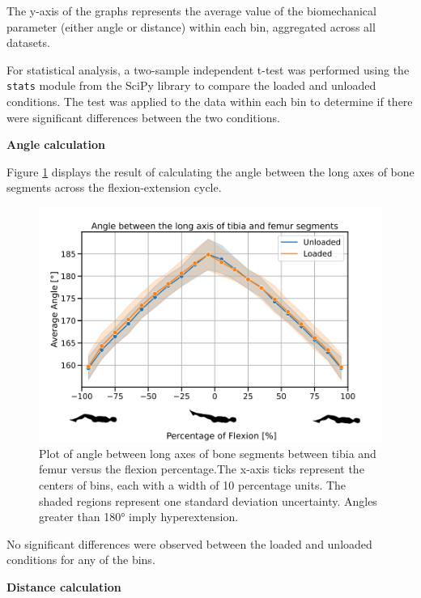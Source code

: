 \documentclass{micro-econ-thesis}
\begin{document}
The y-axis of the graphs represents the average value of the biomechanical parameter (either angle or distance) within each bin, aggregated across all datasets. 

For statistical analysis, a two-sample independent t-test was performed using the \texttt{stats} module from the  SciPy library to compare the loaded and unloaded conditions. The test was applied to the data within each bin to determine if there were significant differences between the two conditions.

\textbf{Angle calculation}

Figure \ref{fig:anglegraphstickman} displays the result of calculating the angle between the long axes of bone segments across the flexion-extension cycle. 
 
\begin{figure}[H]
	\centering
	\includegraphics[width=0.7\linewidth]{angle_graph_stickman_modified}
	\caption{Plot of angle between long axes of bone segments between tibia and femur versus the flexion percentage.The x-axis ticks represent the centers of bins, each with a width of 10 percentage units. The shaded regions represent one standard deviation uncertainty. Angles greater than 180° imply hyperextension.}
	\label{fig:anglegraphstickman}
\end{figure}

No significant differences were observed between the loaded and unloaded conditions for any of the bins.

\textbf{Distance calculation }
\end{document}
